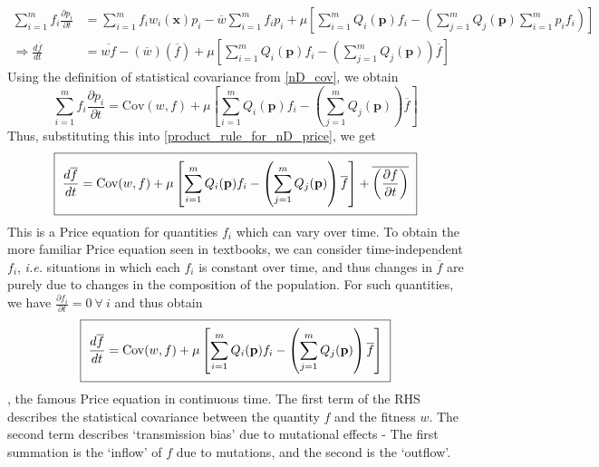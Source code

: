 \begin{align*}
\sum\limits_{i=1}^{m}f_i\frac{\partial p_i}{\partial t} &= \sum\limits_{i=1}^{m}f_iw_i(\mathbf{x})p_i - \overline{w}\sum\limits_{i=1}^{m}f_ip_i + \mu\left[\sum\limits_{i=1}^{m}Q_i(\mathbf{p})f_i - \left(\sum\limits_{j=1}^{m}Q_j(\mathbf{p})\sum\limits_{i=1}^{m}p_if_i\right)\right]\\
\Rightarrow \frac{d\overline{f}}{dt} &= \overline{wf}-(\overline{w})(\overline{f}) + \mu\left[\sum\limits_{i=1}^{m}Q_i(\mathbf{p})f_i - \left(\sum\limits_{j=1}^{m}Q_j(\mathbf{p})\right)\overline{f}\right]
\end{align*}
Using the definition of statistical covariance from \eqref{nD_cov}, we obtain
\begin{equation}
\sum\limits_{i=1}^{m}f_i\frac{\partial p_i}{\partial t} = \mathrm{Cov}(w,f) + \mu\left[\sum\limits_{i=1}^{m}Q_i(\mathbf{p})f_i - \left(\sum\limits_{j=1}^{m}Q_j(\mathbf{p})\right)\overline{f}\right] 
\end{equation}
Thus, substituting this into \eqref{product_rule_for_nD_price}, we get
\begin{equation}
\label{nD_Price_time_dependent}
\setlength{\fboxsep}{2\fboxsep}\boxed{\frac{d\overline{f}}{dt} = \mathrm{Cov}(w,f) + \mu\left[\sum\limits_{i=1}^{m}Q_i(\mathbf{p})f_i - \left(\sum\limits_{j=1}^{m}Q_j(\mathbf{p})\right)\overline{f}\right] + \overline{\left(\frac{\partial f}{\partial t}\right)}}
\end{equation}
This is a Price equation for quantities $f_i$ which can vary over time. To obtain the more familiar Price equation seen in textbooks, we can consider time-independent $f_i$, \emph{i.e.} situations in which each $f_i$ is constant over time, and thus changes in $\overline{f}$ are purely due to changes in the composition of the population. For such quantities, we have $\frac{\partial f_i}{\partial t} = 0 \ \forall \ i$ and thus obtain 
\begin{equation}
\label{nD_Price}
\setlength{\fboxsep}{2\fboxsep}\boxed{
	\frac{d\overline{f}}{dt} = \mathrm{Cov}(w,f) + \mu\left[\sum\limits_{i=1}^{m}Q_i(\mathbf{p})f_i - \left(\sum\limits_{j=1}^{m}Q_j(\mathbf{p})\right)\overline{f}\right]}
\end{equation}
, the famous Price equation in continuous time. The first term of the RHS describes the statistical covariance between the quantity $f$ and the fitness $w$. The second term describes `transmission bias' due to mutational effects - The first summation is the `inflow' of $f$ due to mutations, and the second is the `outflow'.

